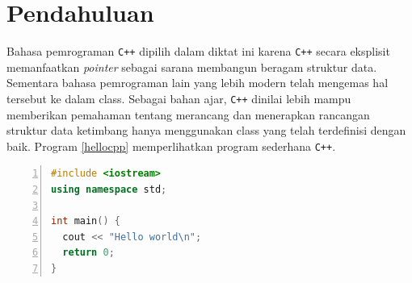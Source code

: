 \section{Pendahuluan}
Bahasa pemrograman \texttt{C++} dipilih dalam diktat ini karena \texttt{C++} secara eksplisit memanfaatkan \textit{pointer} sebagai sarana membangun beragam struktur data. Sementara bahasa pemrograman lain yang lebih modern telah mengemas hal tersebut ke dalam class. Sebagai bahan ajar, \texttt{C++} dinilai lebih mampu memberikan pemahaman tentang merancang dan menerapkan rancangan struktur data ketimbang hanya menggunakan class yang telah terdefinisi dengan baik. Program \ref{hellocpp} memperlihatkan program sederhana \texttt{C++}.

\scriptsize
\begin{lstlisting}[language=c++, numbers=left, numberstyle=\tiny, caption=hello.cpp, showstringspaces=false, label=hellocpp]
#include <iostream>
using namespace std;

int main() {
  cout << "Hello world\n";
  return 0;
}
\end{lstlisting}
\normalsize

